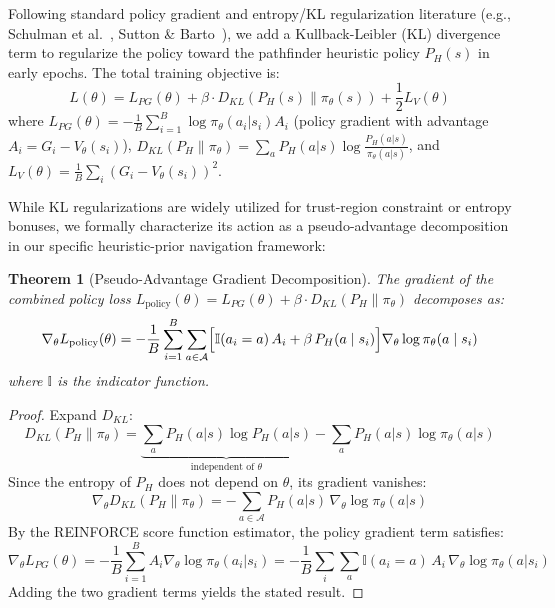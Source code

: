 \documentclass{article}
\newtheorem{theorem}{Theorem}[section]
\begin{document}
Following standard policy gradient and entropy/KL regularization literature (e.g., Schulman et al.~\cite{schulman2017proximal}, Sutton \& Barto~\cite{sutton2018reinforcement}), we add a Kullback-Leibler (KL) divergence term to regularize the policy toward the pathfinder heuristic policy $P_H(s)$ in early epochs. The total training objective is:
\begin{equation}
    L(\theta) = L_{PG}(\theta) + \beta \cdot D_{KL}(P_H(s) \parallel \pi_\theta(s)) + \frac{1}{2} L_V(\theta)
    \label{eq:total_loss}
\end{equation}
where $L_{PG}(\theta) = -\frac{1}{B}\sum_{i=1}^B \log\pi_\theta(a_i|s_i) A_i$ (policy gradient with advantage $A_i = G_i - V_\theta(s_i)$), $D_{KL}(P_H \parallel \pi_\theta) = \sum_a P_H(a|s)\log\frac{P_H(a|s)}{\pi_\theta(a|s)}$, and $L_V(\theta) = \frac{1}{B}\sum_i(G_i - V_\theta(s_i))^2$.

While KL regularizations are widely utilized for trust-region constraint or entropy bonuses, we formally characterize its action as a pseudo-advantage decomposition in our specific heuristic-prior navigation framework:
\begin{theorem}[Pseudo-Advantage Gradient Decomposition]\label{thm:gradient_decomp}
The gradient of the combined policy loss $L_{\mathrm{policy}}(\theta) = L_{PG}(\theta) + \beta \cdot D_{KL}(P_H \parallel \pi_\theta)$ decomposes as:
\begin{equation}
    \nabla_\theta L_{\mathrm{policy}}(\theta)
    = -\frac{1}{B} \sum_{i=1}^B \sum_{a \in \mathcal{A}}
    \Bigl[\mathbb{I}(a_i = a)\, A_i + \beta\, P_H(a \mid s_i)\Bigr]
    \nabla_\theta \log \pi_\theta(a \mid s_i)
\end{equation}
where $\mathbb{I}$ is the indicator function.
\end{theorem}

\begin{proof}
Expand $D_{KL}$:
\begin{equation}
    D_{KL}(P_H \parallel \pi_\theta) = \underbrace{\sum_a P_H(a|s) \log P_H(a|s)}_{\text{independent of } \theta} - \sum_a P_H(a|s) \log \pi_\theta(a|s)
\end{equation}
Since the entropy of $P_H$ does not depend on $\theta$, its gradient vanishes:
\begin{equation}
    \nabla_\theta D_{KL}(P_H \parallel \pi_\theta) = -\sum_{a \in \mathcal{A}} P_H(a|s)\, \nabla_\theta \log \pi_\theta(a|s)
\end{equation}
By the REINFORCE score function estimator, the policy gradient term satisfies:
\begin{equation}
    \nabla_\theta L_{PG}(\theta) = -\frac{1}{B}\sum_{i=1}^B A_i \nabla_\theta \log \pi_\theta(a_i|s_i) = -\frac{1}{B}\sum_i \sum_a \mathbb{I}(a_i=a)\, A_i\, \nabla_\theta \log\pi_\theta(a|s_i)
\end{equation}
Adding the two gradient terms yields the stated result.
\end{proof}
\end{document}
